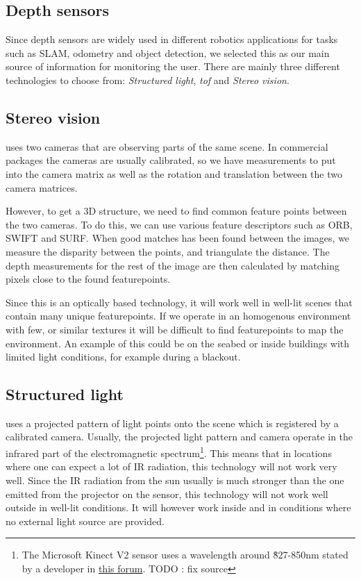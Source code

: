 
\begin{appendices}
  
\section{Depth sensors}

Since depth sensors are widely used in different robotics applications for tasks such as SLAM, odometry and object detection, we selected this as our main source of information for monitoring the user. There are mainly three different technologies to choose from: \emph{Structured light}, \emph{\gls{tof}} and \emph{Stereo vision}. 

\subsection{Stereo vision} uses two cameras that are observing parts of the same scene. In commercial packages the cameras are usually calibrated, so we have measurements to put into the camera matrix as well as the rotation and translation between the two camera matrices.

However, to get a 3D structure, we need to find common feature points between the two cameras. To do this, we can use various feature descriptors such as ORB, SWIFT and SURF. When good matches has been found between the images, we measure the disparity between the points, and triangulate the distance. The depth measurements for the rest of the image are then calculated by matching pixels close to the found featurepoints.

Since this is an optically based technology, it will work well in well-lit scenes that contain many unique featurepoints. If we operate in an homogenous environment with few, or similar textures it will be difficult to find featurepoints to map the environment. An example of this could be on the seabed or inside buildings with limited light conditions, for example during a blackout.

\subsection{Structured light} uses a projected pattern of light points onto the scene which is registered by a calibrated camera. Usually, the projected light pattern and camera operate in the infrared part of the electromagnetic spectrum\footnote{The Microsoft Kinect V2 sensor uses a wavelength around \~827-850nm stated by a developer in \href{https://social.msdn.microsoft.com/Forums/en-US/e92e6f9b-4800-4b48-8ae7-5c8b1353d661/infrared-wavelength?forum=kinectv2sdk}{this forum}. {\color{red} TODO : fix source}}. This means that in locations where one can expect a lot of IR radiation, this technology will not work very well. Since the IR radiation from the sun usually is much stronger than the one emitted from the projector on the sensor, this technology will not work well outside in well-lit conditions. It will however work inside and in conditions where no external light source are provided.


\end{appendices}
